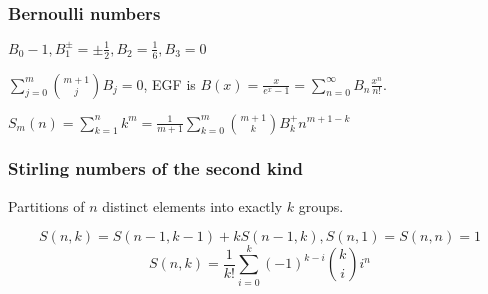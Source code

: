 \subsubsection{Bernoulli numbers}

$B_0-1,B_1^{\pm}=\pm\frac{1}{2},B_2=\frac{1}{6},B_3=0$

$\displaystyle\sum_{j=0}^m\binom{m+1}{j}B_j=0$, EGF is $B(x) = \frac{x}{e^x - 1}=\displaystyle\sum_{n=0}^\infty B_n\frac{x^n}{n!}$.

$S_m(n)=\displaystyle\sum_{k=1}^nk^m=\frac{1}{m+1}\sum_{k=0}^m\binom{m+1}{k}B^{+}_kn^{m+1-k}$

\subsubsection{Stirling numbers of the second kind}
Partitions of $n$ distinct elements into exactly $k$ groups. 

\[ S(n, k) = S(n - 1, k - 1) + kS(n - 1, k), S(n, 1) = S(n, n) = 1 \]
\[ S(n, k) = \frac{1}{k!}\sum_{i=0}^{k}(-1)^{k-i}{k \choose i}i^n \]

